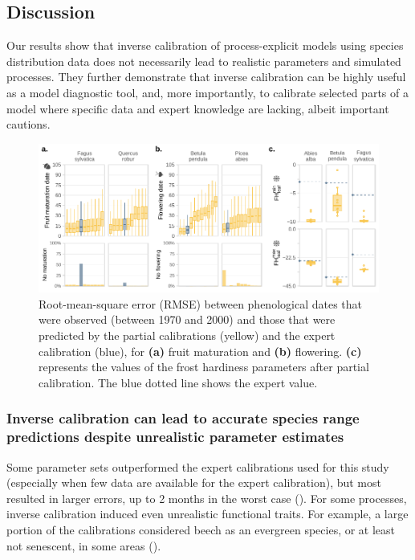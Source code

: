 \clearpage

\subsection{Discussion}

Our results show that inverse calibration of process-explicit models using species distribution data does not necessarily lead to realistic parameters and simulated processes. They further demonstrate that inverse calibration can be highly useful as a model diagnostic tool, and, more importantly, to calibrate selected parts of a model where specific data and expert knowledge are lacking, albeit important cautions.

\begin{figure}[htpb]
\hspace*{-1cm}
\centering
\begin{subcaptiongroup}
\label{fig:5A} 
\label{fig:5B}
\label{fig:5C}
\end{subcaptiongroup}
\includegraphics{chapter3/figs/fig7-1 - icons.pdf}
\caption{Root-mean-square error (RMSE) between phenological dates that were observed (between 1970 and 2000) and those that were predicted by the partial calibrations (yellow) and the expert calibration (blue), for \textbf{(a)} fruit maturation and \textbf{(b)} flowering. \textbf{(c)} represents the values of the frost hardiness parameters after partial calibration. The blue dotted line shows the expert value.}
\label{fig:5}
\end{figure}

\subsubsection{Inverse calibration can lead to accurate species range predictions despite unrealistic parameter estimates}

Some parameter sets outperformed the expert calibrations used for this study (especially when few data are available for the expert calibration), but most resulted in larger errors, up to 2 months in the worst case (). For some processes, inverse calibration induced even unrealistic functional traits. For example, a large portion of the calibrations considered beech as an evergreen species, or at least not senescent, in some areas ().

